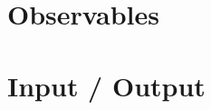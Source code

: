 \documentclass[a4paper, 12pt]{article}
\def\buildMode{buildmissing}
\begin{document}
    \section{Observables}
        \begin{figure}[htb]
            \centering
            
            \caption{}
        \end{figure}
        \clearpage

    \section{Input / Output}

        \begin{figure}[htb]
            \centering
            
            \caption{}
        \end{figure}

        \begin{figure}[htb]
            \centering
            
            \caption{}
        \end{figure}
        \clearpage

    \nocite{*}
    \printbibliography
\end{document}
